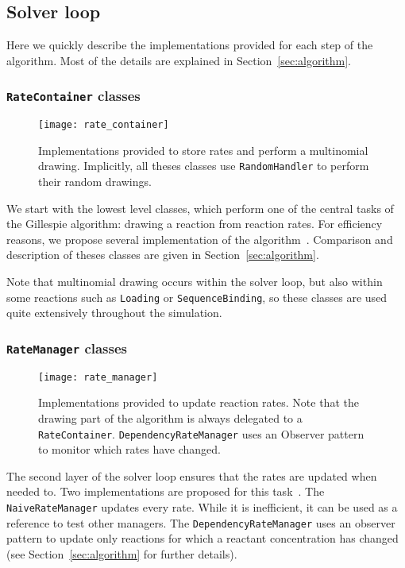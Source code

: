 \subsection{Solver loop}

Here we quickly describe the implementations provided for each step of the algorithm.
Most of the details are explained in Section~\ref{sec:algorithm}.


\subsubsection{\texttt{RateContainer} classes}

\begin{figure}[!h]
  \centering
  \texttt{[image: rate\_container]}
  \caption{
  Implementations provided to store rates and perform a multinomial drawing.
  Implicitly, all theses classes use \texttt{RandomHandler} to perform their random drawings.
  }
\label{fig:rate_container}
\end{figure}

We start with the lowest level classes,
which perform one of the central tasks of the Gillespie algorithm:
drawing a reaction from reaction rates.
For efficiency reasons, we propose several implementation of the algorithm~.
Comparison and description of theses classes are given in Section~\ref{sec:algorithm}.

Note that multinomial drawing occurs within the solver loop,
but also within some reactions such as \texttt{Loading} or \texttt{SequenceBinding},
so these classes are used quite extensively throughout the simulation.


\subsubsection{\texttt{RateManager} classes}

\begin{figure}[!h]
  \centering
  \texttt{[image: rate\_manager]}
  \caption{
  Implementations provided to update reaction rates.
  Note that the drawing part of the algorithm is always delegated to a \texttt{RateContainer}.
  \texttt{DependencyRateManager} uses an Observer pattern to monitor which rates have changed.
  }
\label{fig:rate_manager}
\end{figure}

The second layer of the solver loop ensures that the rates are updated when needed to.
Two implementations are proposed for this task~.
The \texttt{NaiveRateManager} updates every rate.
While it is inefficient, it can be used as a reference to test other managers.
The \texttt{DependencyRateManager} uses an observer pattern to update only reactions
for which a reactant concentration has changed (see Section~\ref{sec:algorithm} for further details).

